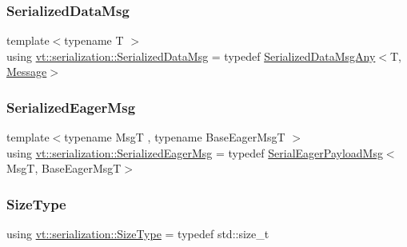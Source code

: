 \subsubsection{\texorpdfstring{Serialized\+Data\+Msg}{SerializedDataMsg}}
{\footnotesize\ttfamily template$<$typename T $>$ \\
using \hyperlink{namespacevt_1_1serialization_a56d2aee859dc963c2b5fad82649dd79a}{vt\+::serialization\+::\+Serialized\+Data\+Msg} = typedef \hyperlink{structvt_1_1serialization_1_1_serialized_data_msg_any}{Serialized\+Data\+Msg\+Any}$<$T, \hyperlink{namespacevt_a3a3ddfef40b4c90915fa43cdd5f129ea}{Message}$>$}

\mbox{\label{namespacevt_1_1serialization_ac8b37425f8316a800cdb0b0f0f8a6438}} 
\subsubsection{\texorpdfstring{Serialized\+Eager\+Msg}{SerializedEagerMsg}}
{\footnotesize\ttfamily template$<$typename MsgT , typename Base\+Eager\+MsgT $>$ \\
using \hyperlink{namespacevt_1_1serialization_ac8b37425f8316a800cdb0b0f0f8a6438}{vt\+::serialization\+::\+Serialized\+Eager\+Msg} = typedef \hyperlink{namespacevt_1_1serialization_af3a0dfd4a0d3fa09c75edba0dc1b7fec}{Serial\+Eager\+Payload\+Msg}$<$MsgT, Base\+Eager\+MsgT$>$}

\mbox{\label{namespacevt_1_1serialization_ac7b555941c0bfd470bee3df22b967ff9}} 
\subsubsection{\texorpdfstring{Size\+Type}{SizeType}}
{\footnotesize\ttfamily using \hyperlink{namespacevt_1_1serialization_ac7b555941c0bfd470bee3df22b967ff9}{vt\+::serialization\+::\+Size\+Type} = typedef std\+::size\+\_\+t}

